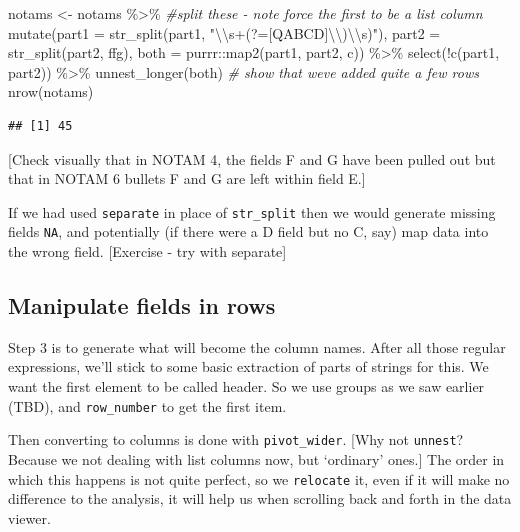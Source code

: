 \documentclass[
]{book}
\newenvironment{Shaded}{\begin{snugshade}}{\end{snugshade}}
\newcommand{\AttributeTok}[1]{\textcolor[rgb]{0.77,0.63,0.00}{#1}}
\newcommand{\CommentTok}[1]{\textcolor[rgb]{0.56,0.35,0.01}{\textit{#1}}}
\newcommand{\FunctionTok}[1]{\textcolor[rgb]{0.00,0.00,0.00}{#1}}
\newcommand{\NormalTok}[1]{#1}
\newcommand{\OtherTok}[1]{\textcolor[rgb]{0.56,0.35,0.01}{#1}}
\newcommand{\SpecialCharTok}[1]{\textcolor[rgb]{0.00,0.00,0.00}{#1}}
\newcommand{\StringTok}[1]{\textcolor[rgb]{0.31,0.60,0.02}{#1}}
\begin{document}
\begin{Shaded}
\begin{Highlighting}[]
\NormalTok{notams }\OtherTok{\textless{}{-}}\NormalTok{ notams }\SpecialCharTok{\%\textgreater{}\%} 
\CommentTok{\#split these {-} note force the first to be a list column}
      \FunctionTok{mutate}\NormalTok{(}\AttributeTok{part1 =} \FunctionTok{str\_split}\NormalTok{(part1, }\StringTok{"}\SpecialCharTok{\textbackslash{}\textbackslash{}}\StringTok{s+(?=[QABCD]}\SpecialCharTok{\textbackslash{}\textbackslash{}}\StringTok{)}\SpecialCharTok{\textbackslash{}\textbackslash{}}\StringTok{s)"}\NormalTok{),}
             \AttributeTok{part2 =} \FunctionTok{str\_split}\NormalTok{(part2, ffg),}
             \AttributeTok{both =}\NormalTok{ purrr}\SpecialCharTok{::}\FunctionTok{map2}\NormalTok{(part1, part2, c)) }\SpecialCharTok{\%\textgreater{}\%}
      \FunctionTok{select}\NormalTok{(}\SpecialCharTok{!}\FunctionTok{c}\NormalTok{(part1, part2)) }\SpecialCharTok{\%\textgreater{}\%}
      \FunctionTok{unnest\_longer}\NormalTok{(both)}
\CommentTok{\# show that we\textquotesingle{}ve added quite a few rows}
\FunctionTok{nrow}\NormalTok{(notams)}
\end{Highlighting}
\end{Shaded}

\begin{verbatim}
## [1] 45
\end{verbatim}

{[}Check visually that in NOTAM 4, the fields F and G have been pulled out but that in NOTAM 6 bullets F and G are left within field E.{]}

If we had used \texttt{separate} in place of \texttt{str\_split} then we would generate missing fields \texttt{NA}, and potentially (if there were a D field but no C, say) map data into the wrong field. {[}Exercise - try with separate{]}

\hypertarget{manipulate-fields-in-rows}{%
\subsection{Manipulate fields in rows}\label{manipulate-fields-in-rows}}

Step 3 is to generate what will become the column names. After all those regular expressions, we'll stick to some basic extraction of parts of strings for this. We want the first element to be called header. So we use groups as we saw earlier (TBD), and \texttt{row\_number} to get the first item.

Then converting to columns is done with \texttt{pivot\_wider}. {[}Why not \texttt{unnest}? Because we not dealing with list columns now, but `ordinary' ones.{]} The order in which this happens is not quite perfect, so we \texttt{relocate} it, even if it will make no difference to the analysis, it will help us when scrolling back and forth in the data viewer.
\end{document}
